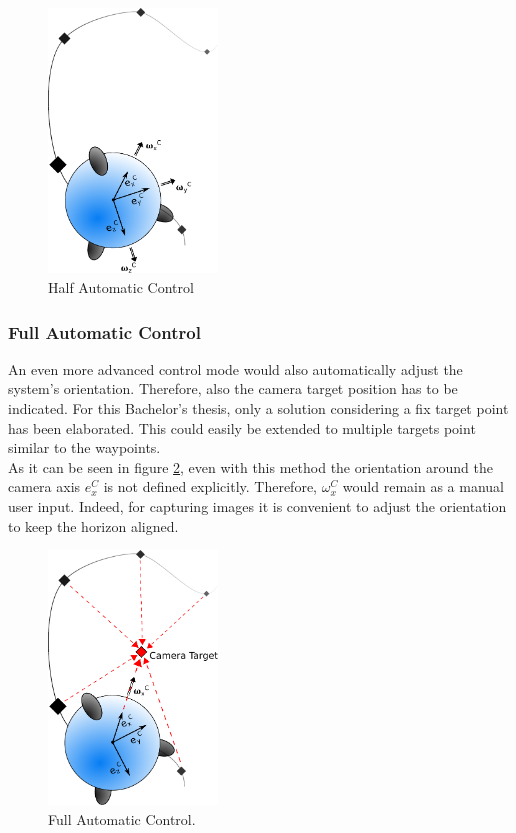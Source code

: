 \begin{figure}[H] %
	\begin{center}
		\includegraphics[width=0.4\textwidth]{HAC.pdf}
		\caption[Half automatic control]{Half Automatic Control}  
		\label{fig:half_automatic_control}		
	\end{center}
\end{figure}

\subsubsection{Full Automatic Control}
An even more advanced control mode would also automatically adjust the system's orientation. Therefore, also the camera target position has to be indicated. For this Bachelor's thesis, only a solution considering a fix target point has been elaborated. This could easily be extended to multiple targets point similar to the waypoints. \\ As it can be seen in figure \ref{fig:full_automatic_control}, even with this method the orientation around the camera axis $e_x^C$ is not defined explicitly. Therefore, $\omega_x^C$ would remain as a manual user input. Indeed, for capturing images it is convenient to adjust the orientation to keep the horizon aligned.


\begin{figure}[H] %
	\begin{center}
		\includegraphics[width=0.4\textwidth]{FAComega.pdf}
		\caption[Full automatic control]{Full Automatic Control.}  
		\label{fig:full_automatic_control}		
	\end{center}
\end{figure}